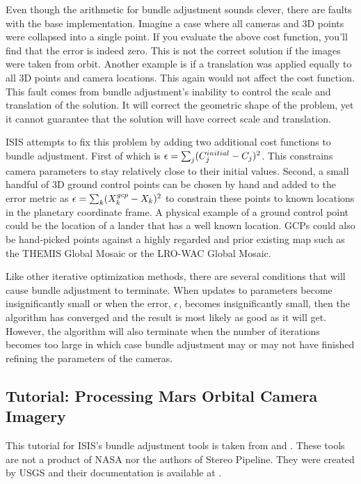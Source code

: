 Even though the arithmetic for bundle adjustment sounds clever, there
are faults with the base implementation. Imagine a case where all
cameras and 3D points were collapsed into a single point. If you
evaluate the above cost function, you'll find that the error is indeed
zero. This is not the correct solution if the images were taken
from orbit. Another example is if a translation was applied equally to
all 3D points and camera locations. This again would not affect the
cost function. This fault comes from bundle adjustment's inability to
control the scale and translation of the solution. It will correct the
geometric shape of the problem, yet it cannot guarantee that the solution
will have correct scale and translation.

\ac{ISIS} attempts to fix this problem by adding two additional cost
functions to bundle adjustment. First of which is ${\bf \epsilon} =
\sum_j(C_j^{initial}-C_j)^2$. This constrains camera parameters to
stay relatively close to their initial values. Second, a small handful
of 3D ground control points can be chosen by hand and added to the
error metric as ${\bf \epsilon} = \sum_k(X_k^{gcp}-X_k)^2$ to
constrain these points to known locations in the planetary coordinate
frame. A physical example of a ground control point could be the
location of a lander that has a well known location. \acp{GCP} could also be
hand-picked points against a highly regarded and prior existing map
such as the THEMIS Global Mosaic or the LRO-WAC Global Mosaic.

Like other iterative optimization methods, there are several
conditions that will cause bundle adjustment to terminate. When
updates to parameters become insignificantly small or when the error,
${\bf \epsilon}$, becomes insignificantly small, then the algorithm
has converged and the result is most likely as good as it will get.
However, the algorithm will also terminate when the number of
iterations becomes too large in which case bundle adjustment may or
may not have finished refining the parameters of the cameras.

\subsection{Tutorial: Processing Mars Orbital Camera Imagery}
\label{sec:ba_example}

This tutorial for ISIS's bundle adjustment tools is taken from
\cite{lunokhod:controlnetwork} and \cite{lunokhod:gcp}. These tools
are not a product of NASA nor the authors of Stereo Pipeline. They
were created by USGS and their documentation is available at
\cite{isis:documentation}.

